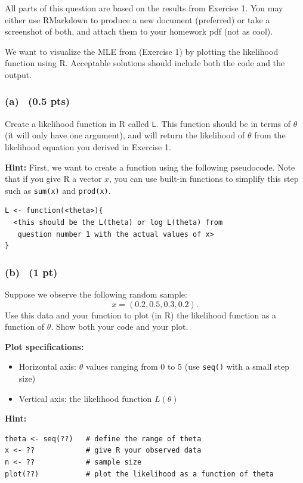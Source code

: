 \documentclass[11pt,letterpaper]{article}
\theoremstyle{remark}
\begin{document}
All parts of this question are based on the results from Exercise 1. You may either use RMarkdown to
produce a new document (preferred) or take a screenshot of both, and attach them to your homework pdf
(not as cool).

We want to visualize the MLE from (Exercise 1) by plotting the likelihood function using R. Acceptable
solutions should include both the code and the output.

\subsubsection*{(a) \, (0.5 pts)}
Create a likelihood function in R called \texttt{L}. This function should be in terms of $\theta$ (it will only
have one argument), and will return the likelihood of $\theta$ from the likelihood equation you derived in
Exercise 1.

\noindent \textbf{Hint:} First, we want to create a function using the following pseudocode. Note that if you give R a vector $x$,
you can use built-in functions to simplify this step such as \texttt{sum(x)} and \texttt{prod(x)}.
\begin{verbatim}
L <- function(<theta>){
  <this should be the L(theta) or log L(theta) from
   question number 1 with the actual values of x>
}
\end{verbatim}

\subsubsection*{(b) \, (1 pt)}
Suppose we observe the following random sample:
\[
x = (0.2, 0.5, 0.3, 0.2).
\]
Use this data and your function to plot (in R) the likelihood function as a function of $\theta$. Show both your
code and your plot.

\noindent \textbf{Plot specifications:}
\begin{itemize}
    \item Horizontal axis: $\theta$ values ranging from 0 to 5 (use \texttt{seq()} with a small step size)
    \item Vertical axis: the likelihood function $L(\theta)$
\end{itemize}

\noindent \textbf{Hint:}
\begin{verbatim}
theta <- seq(??)   # define the range of theta
x <- ??            # give R your observed data
n <- ??            # sample size
plot(??)           # plot the likelihood as a function of theta
\end{verbatim}
\end{document}
